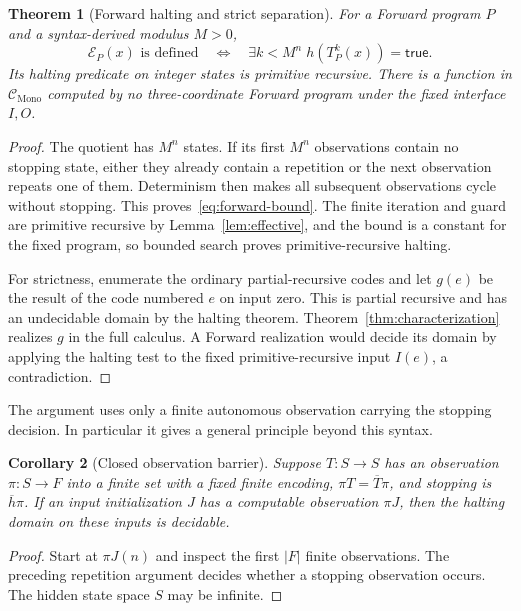 \documentclass[11pt]{article}
\numberwithin{equation}{section}
\newtheorem{theorem}{Theorem}[section]
\newtheorem{corollary}[theorem]{Corollary}
\theoremstyle{definition}
\theoremstyle{remark}
\begin{document}
\begin{theorem}[Forward halting and strict separation]\label{thm:forward}
For a Forward program $P$ and a syntax-derived modulus $M>0$,
\begin{equation}\label{eq:forward-bound}
 \mathcal E_P(x)\text{ is defined}
 \quad\Longleftrightarrow\quad
 \exists k<M^n\; h(T_P^k(x))=\mathsf{true}.
\end{equation}
Its halting predicate on integer states is primitive recursive.
There is a function in $\mathcal C_{\mathrm{Mono}}$ computed by no
three-coordinate Forward program under the fixed interface $I,O$.
\end{theorem}
\begin{proof}
The quotient has $M^n$ states. If its first $M^n$ observations contain
no stopping state, either they already contain a repetition or the
next observation repeats one of them. Determinism then makes all
subsequent observations cycle without stopping. This
proves~\eqref{eq:forward-bound}.
The finite iteration and guard are primitive recursive by
Lemma~\ref{lem:effective}, and the bound is a constant for the fixed
program, so bounded search proves primitive-recursive halting.

For strictness, enumerate the ordinary partial-recursive codes and
let $g(e)$ be the result of the code numbered $e$ on input zero.
This is partial recursive and has an undecidable domain by the
halting theorem. Theorem~\ref{thm:characterization} realizes $g$
in the full calculus. A Forward realization would decide its domain
by applying the halting test to the fixed primitive-recursive input
$I(e)$, a contradiction.
\end{proof}

The argument uses only a finite autonomous observation carrying the
stopping decision. In particular it gives a general principle beyond
this syntax.
\begin{corollary}[Closed observation barrier]\label{cor:barrier}
Suppose $T:S\to S$ has an observation $\pi:S\to F$ into a finite
set with a fixed finite encoding, $\pi T=\overline T\pi$, and
stopping is $\overline h\pi$.
If an input initialization $J$ has a computable observation $\pi J$,
then the halting domain on these inputs is decidable.
\end{corollary}
\begin{proof}
Start at $\pi J(n)$ and inspect the first $|F|$ finite observations.
The preceding repetition argument decides whether a stopping
observation occurs. The hidden state space $S$ may be infinite.
\end{proof}
\end{document}
